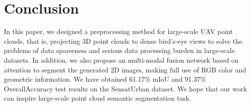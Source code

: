 \documentclass[conference]{IEEEtran}
\begin{document}
\section{Conclusion}
In this paper, we designed a preprocessing method for large-scale UAV point clouds, that is, projecting 3D point clouds to dense bird's-eye views to solve the problems of data sparseness and serious data processing burden in large-scale datasets. In addition, we also propose an multi-modal fusion network based on attention to segment the generated 2D images, making full use of RGB color and geometric information. We have obtained 61.17\% mIoU and 91.37\% OverallAccuracy test results on the SensatUrban dataset. We hope that our work can inspire large-scale point cloud semantic segmentation task.




\vspace{12pt}
\end{document}

